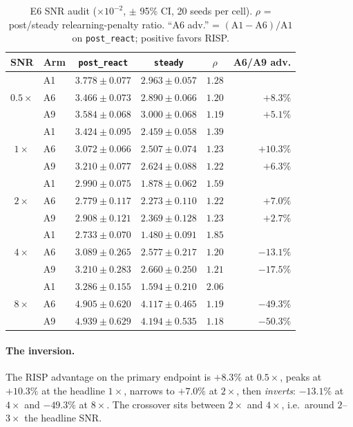 \documentclass[11pt,a4paper]{article}
\theoremstyle{definition}
\theoremstyle{plain}
\begin{document}
\begin{table}[h]
\centering
\caption{E6 SNR audit ($\times 10^{-2}$, $\pm$ 95\% CI, 20 seeds per cell).
$\rho$ = post/steady relearning-penalty ratio. ``A6 adv.'' =
$(\text{A1}-\text{A6})/\text{A1}$ on \texttt{post\_react}; positive favors
RISP.}
\label{tab:dd5-e6}
\scriptsize
\begin{tabular}{clccc r}
\toprule
SNR & Arm & \texttt{post\_react} & \texttt{steady} & $\rho$ & A6/A9 adv. \\
\midrule
\multirow{3}{*}{$0.5\times$}
& A1  & $3.778 \pm 0.077$ & $2.963 \pm 0.057$ & $1.28$ & \\
& A6  & $3.466 \pm 0.073$ & $2.890 \pm 0.066$ & $1.20$ & $+8.3\%$ \\
& A9  & $3.584 \pm 0.068$ & $3.000 \pm 0.068$ & $1.19$ & $+5.1\%$ \\
\midrule
\multirow{3}{*}{$1\times$}
& A1  & $3.424 \pm 0.095$ & $2.459 \pm 0.058$ & $1.39$ & \\
& A6  & $3.072 \pm 0.066$ & $2.507 \pm 0.074$ & $1.23$ & $+10.3\%$ \\
& A9  & $3.210 \pm 0.077$ & $2.624 \pm 0.088$ & $1.22$ & $+6.3\%$ \\
\midrule
\multirow{3}{*}{$2\times$}
& A1  & $2.990 \pm 0.075$ & $1.878 \pm 0.062$ & $1.59$ & \\
& A6  & $2.779 \pm 0.117$ & $2.273 \pm 0.110$ & $1.22$ & $+7.0\%$ \\
& A9  & $2.908 \pm 0.121$ & $2.369 \pm 0.128$ & $1.23$ & $+2.7\%$ \\
\midrule
\multirow{3}{*}{$4\times$}
& A1  & $2.733 \pm 0.070$ & $1.480 \pm 0.091$ & $1.85$ & \\
& A6  & $3.089 \pm 0.265$ & $2.577 \pm 0.217$ & $1.20$ & $-13.1\%$ \\
& A9  & $3.210 \pm 0.283$ & $2.660 \pm 0.250$ & $1.21$ & $-17.5\%$ \\
\midrule
\multirow{3}{*}{$8\times$}
& A1  & $3.286 \pm 0.155$ & $1.594 \pm 0.210$ & $2.06$ & \\
& A6  & $4.905 \pm 0.620$ & $4.117 \pm 0.465$ & $1.19$ & $-49.3\%$ \\
& A9  & $4.939 \pm 0.629$ & $4.194 \pm 0.535$ & $1.18$ & $-50.3\%$ \\
\bottomrule
\end{tabular}
\end{table}

\paragraph{The inversion.} The RISP advantage on the primary endpoint
is $+8.3\%$ at $0.5\times$, peaks at $+10.3\%$ at the headline $1\times$,
narrows to $+7.0\%$ at $2\times$, then \emph{inverts}: $-13.1\%$ at
$4\times$ and $-49.3\%$ at $8\times$. The crossover sits between $2\times$
and $4\times$, i.e.\ around $2$--$3\times$ the headline SNR.
\end{document}
